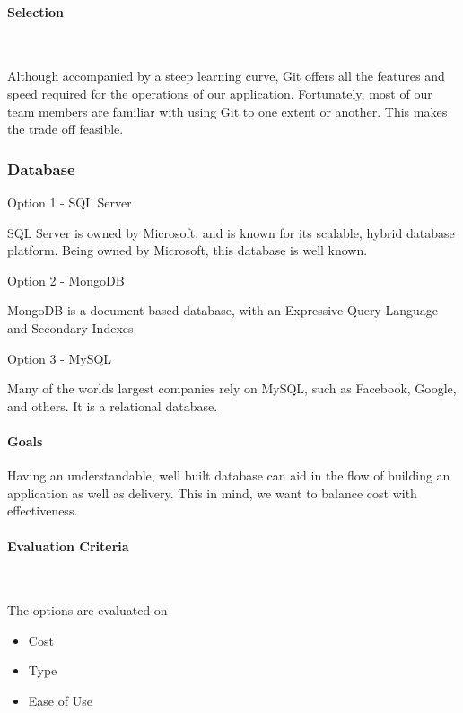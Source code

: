 \documentclass[letterpaper, 10pt, draftclsnofoot, compsoc, onecolumn]{IEEEtran}
\begin{document}
{\medskip
\paragraph{Selection} ~\\
{\noindent Although accompanied by a steep learning curve, Git offers all the features and speed required for the operations of our application. 
Fortunately, most of our team members are familiar with using Git to one extent or another. This makes the trade off feasible. \par}

\medskip

\newpage
\subsubsection{Database}
{\noindent Option 1 - SQL Server \par}
{\noindent SQL Server is owned by Microsoft, and is known for its scalable, hybrid database platform. Being owned by Microsoft, this database is well known. \cite{SQLServer} \par}

\medskip
{\noindent Option 2 - MongoDB \par}
{\noindent MongoDB is a document based database, with an Expressive Query Language and Secondary Indexes. \cite{MongoDB}  \par}

\medskip
{\noindent Option 3 - MySQL \par}
{\noindent Many of the worlds largest companies rely on MySQL, such as Facebook, Google, and others. It is a relational database. \cite{MySQL}  \par}

\medskip
\paragraph{Goals}
{\noindent Having an understandable, well built database can aid in the flow of building an application as well as delivery. This in mind, we want to balance cost with effectiveness. \par}

\medskip
\newpage
\paragraph{Evaluation Criteria} ~\\
{\noindent The options are evaluated on 

\begin{itemize}
\item Cost
\item Type
\item Ease of Use
\end{itemize}

}}
\end{document}
